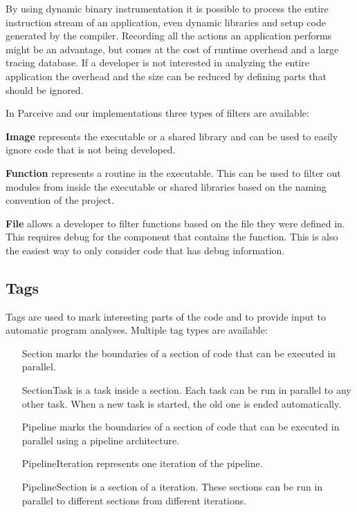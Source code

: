 By using dynamic binary instrumentation it is possible to process the entire instruction stream of an application, even dynamic libraries and setup code generated by the compiler. Recording all the actions an application performs might be an advantage, but comes at the cost of runtime overhead and a large tracing database. If a developer is not interested in analyzing the entire application the overhead and the size can be reduced by defining parts that should be ignored.

In Parceive and our implementations three types of filters are available:

\textbf{Image} represents the executable or a shared library and can be used to easily ignore code that is not being developed.

\textbf{Function} represents a routine in the executable. This can be used to filter out modules from inside the executable or shared libraries based on the naming convention of the project.

\textbf{File} allows a developer to filter functions based on the file they were defined in. This requires debug for the component that contains the function. This is also the easiest way to only consider code that has debug information.

\subsection{Tags}

Tags are used to mark interesting parts of the code and to provide input to automatic program analyses. Multiple tag types are available:

\begin{itemize}
	\item [Section] marks the boundaries of a section of code that can be executed in parallel.
	\item [SectionTask] is a task inside a section. Each task can be run in parallel to any other task. When a new task is started, the old one is ended automatically.
	\item [Pipeline] marks the boundaries of a section of code that can be executed in parallel using a pipeline architecture.
	\item [PipelineIteration] represents one iteration of the pipeline.
	\item [PipelineSection] is a section of a iteration. These sections can be run in parallel to different sections from different iterations.
\end{itemize}

